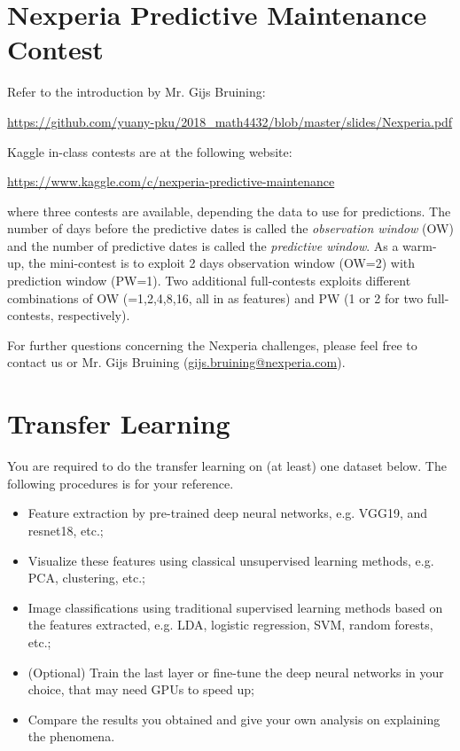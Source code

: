 \documentclass[11pt]{article}
\begin{document}
\section{Nexperia Predictive Maintenance Contest}

Refer to the introduction by Mr. Gijs Bruining:

\url{https://github.com/yuany-pku/2018_math4432/blob/master/slides/Nexperia.pdf}

Kaggle in-class contests are at the following website:

\url{https://www.kaggle.com/c/nexperia-predictive-maintenance}

\noindent where three contests are available, depending the data to use for predictions. The number of days before the predictive dates is called the \emph{observation window} (OW) and the number of predictive dates is called the \emph{predictive window}. As a warm-up, the mini-contest is to exploit 2 days observation window (OW=2) with prediction window (PW=1). Two additional full-contests exploits different combinations of OW (=1,2,4,8,16, all in as features) and PW (1 or 2 for two full-contests, respectively). 
 
For further questions concerning the Nexperia challenges, please feel free to contact us or Mr. Gijs Bruining (\href{gijs.bruining@nexperia.com}{gijs.bruining@nexperia.com}). 


\section{Transfer Learning}

You are required to do the transfer learning on (at least) one dataset below. The following procedures is for your reference.

\begin{itemize}
\item Feature extraction by pre-trained deep neural networks, e.g. VGG19, and resnet18, etc.;
\item Visualize these features using classical unsupervised learning methods, e.g. PCA, clustering, etc.; 
\item Image classifications using traditional supervised learning methods based on the features extracted, e.g. LDA, logistic regression, SVM, random forests, etc.;
\item (Optional) Train the last layer or fine-tune the deep neural networks in your choice, that may need GPUs to speed up; 
\item Compare the results you obtained and give your own analysis on explaining the phenomena.
\end{itemize}
\end{document}
